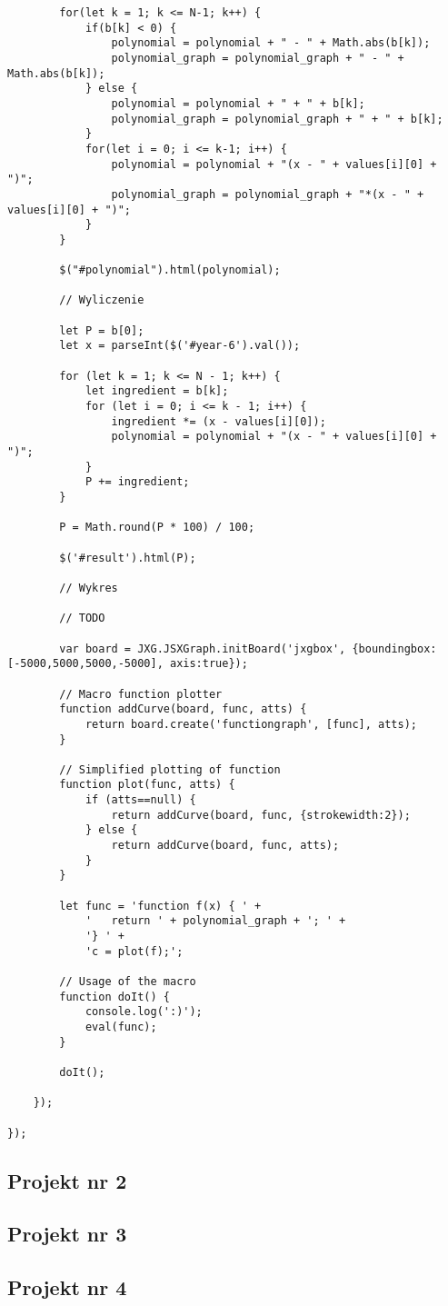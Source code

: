 \documentclass[a4paper,12pt]{article}
\begin{document}
\begin{lstlisting}
        for(let k = 1; k <= N-1; k++) {
            if(b[k] < 0) {
                polynomial = polynomial + " - " + Math.abs(b[k]);
                polynomial_graph = polynomial_graph + " - " + Math.abs(b[k]);
            } else {
                polynomial = polynomial + " + " + b[k];
                polynomial_graph = polynomial_graph + " + " + b[k];
            }
            for(let i = 0; i <= k-1; i++) {
                polynomial = polynomial + "(x - " + values[i][0] + ")";
                polynomial_graph = polynomial_graph + "*(x - " + values[i][0] + ")";
            }
        }

        $("#polynomial").html(polynomial);

        // Wyliczenie

        let P = b[0];
        let x = parseInt($('#year-6').val());

        for (let k = 1; k <= N - 1; k++) {
            let ingredient = b[k];
            for (let i = 0; i <= k - 1; i++) {
                ingredient *= (x - values[i][0]);
                polynomial = polynomial + "(x - " + values[i][0] + ")";
            }
            P += ingredient;
        }

        P = Math.round(P * 100) / 100;

        $('#result').html(P);

        // Wykres

        // TODO

        var board = JXG.JSXGraph.initBoard('jxgbox', {boundingbox:[-5000,5000,5000,-5000], axis:true});

        // Macro function plotter
        function addCurve(board, func, atts) {
            return board.create('functiongraph', [func], atts);
        }

        // Simplified plotting of function
        function plot(func, atts) {
            if (atts==null) {
                return addCurve(board, func, {strokewidth:2});
            } else {
                return addCurve(board, func, atts);
            }
        }

        let func = 'function f(x) { ' +
            '   return ' + polynomial_graph + '; ' +
            '} ' +
            'c = plot(f);';

        // Usage of the macro
        function doIt() {
            console.log(':)');
            eval(func);
        }

        doIt();

    });

});
\end{lstlisting}

\subsection{Projekt nr 2}

\subsection{Projekt nr 3}

\subsection{Projekt nr 4}
\end{document}
